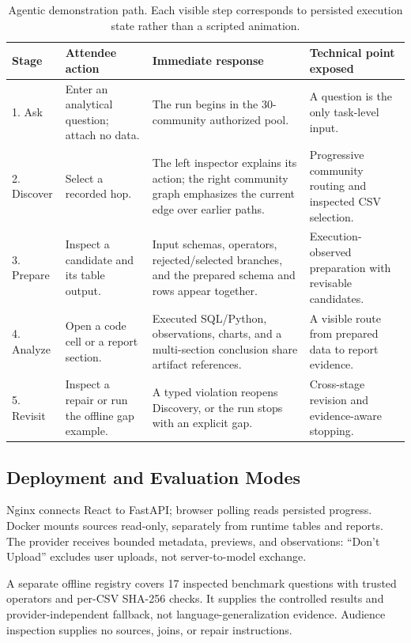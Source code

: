 \documentclass[sigconf, nonacm]{acmart}
\begin{document}
\begin{table}[t]
  \caption{Agentic demonstration path. Each visible step
  corresponds to persisted execution state rather than a scripted animation.}
  \label{tab:script}
  \small
  \begin{tabular}{p{}p{}p{}p{}}
    \toprule
    Stage & Attendee action & Immediate response & Technical point exposed \\
    \midrule
    1. Ask & Enter an analytical question; attach no data. &
      The run begins in the 30-community authorized pool. &
      A question is the only task-level input. \\
    2. Discover & Select a recorded hop. &
      The left inspector explains its action; the right community graph
      emphasizes the current edge over earlier paths. &
      Progressive community routing and inspected CSV selection. \\
    3. Prepare & Inspect a candidate and its table output. &
      Input schemas, operators, rejected/selected branches, and the prepared
      schema and rows appear together. &
      Execution-observed preparation with revisable candidates. \\
    4. Analyze & Open a code cell or a report section. &
      Executed SQL/Python, observations, charts, and a multi-section conclusion
      share artifact references. &
      A visible route from prepared data to report evidence. \\
    5. Revisit & Inspect a repair or run the offline gap example. &
      A typed violation reopens Discovery, or the run stops with an explicit gap. &
      Cross-stage revision and evidence-aware stopping. \\
    \bottomrule
  \end{tabular}
\end{table}

\subsection{Deployment and Evaluation Modes}

Nginx connects React to FastAPI; browser polling reads persisted progress.
Docker mounts sources read-only, separately from runtime tables and reports.
The provider receives bounded metadata, previews, and observations:
``Don't Upload'' excludes user uploads, not server-to-model exchange.

A separate offline registry covers 17 inspected benchmark questions with
trusted operators and per-CSV SHA-256 checks.  It supplies the controlled
results and provider-independent fallback, not language-generalization
evidence.  Audience inspection supplies no sources, joins, or repair instructions.
\end{document}
